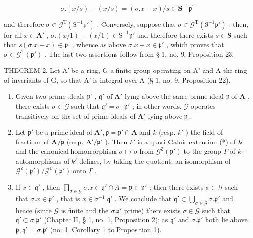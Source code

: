 \[
\sigma . (x / s) - (x / s) = (\sigma . x - x) / s \in \mathbf {S} ^ {- 1} \mathfrak {p} ^ {\prime}
\]

and therefore \(\sigma \in \mathcal{G}^{\mathrm{T}}(\mathrm{S}^{-1}\mathfrak{p}')\) . Conversely, suppose that \(\sigma \in \mathcal{G}^{\mathrm{T}}(\mathrm{S}^{-1}\mathfrak{p}')\) ; then, for all \(x \in \mathbf{A}'\) , \(\sigma.(x/1) - (x/1) \in \mathrm{S}^{-1}\mathfrak{p}'\) and therefore there exists \(s \in \mathbf{S}\) such that \(s(\sigma.x - x) \in \mathfrak{p}'\) , whence as above \(\sigma.x - x \in \mathfrak{p}'\) , which proves that \(\sigma \in \mathcal{G}^{\mathrm{T}}(\mathfrak{p}')\) . The last two assertions follow from § 1, no. 9, Proposition 23.

THEOREM 2. Let A' be a ring, G a finite group operating on A' and A the ring of invariants of G, so that A' is integral over A (§ 1, no. 9, Proposition 22).

\begin{enumerate}
\def\labelenumi{(\roman{enumi})}
\item
  Given two prime ideals \(\mathfrak{p}'\) , \(\mathfrak{q}'\) of \(\mathbf{A}'\) lying above the same prime ideal \(\mathfrak{p}\) of \(\mathbf{A}\) , there exists \(\sigma \in \mathcal{G}\) such that \(\mathfrak{q}' = \sigma \cdot \mathfrak{p}'\) ; in other words, \(\mathcal{G}\) operates transitively on the set of prime ideals of \(\mathbf{A}'\) lying above \(\mathfrak{p}\) .
\item
  Let \(\mathfrak{p}'\) be a prime ideal of \(\mathbf{A}', \mathfrak{p} = \mathfrak{p}' \cap \mathbf{A}\) and \(k\) (resp. \(k'\) ) the field of fractions of \(\mathbf{A}/\mathfrak{p}\) (resp. \(\mathbf{A}'/\mathfrak{p}'\) ). Then \(k'\) is a quasi-Galois extension (*) of \(k\) and the canonical homomorphism \(\sigma \mapsto \bar{\sigma}\) from \(\mathcal{G}^{\mathrm{Z}}(\mathfrak{p}')\) to the group \(\Gamma\) of \(k\) -automorphisms of \(k'\) defines, by taking the quotient, an isomorphism of \(\mathcal{G}^{\mathrm{Z}}(\mathfrak{p}') / \mathcal{G}^{\mathrm{T}}(\mathfrak{p}')\) onto \(\Gamma\) .
\setcounter{enumi}{0}
\item
  If \(x \in \mathfrak{q}'\) , then \(\prod_{\sigma \in \mathcal{G}} \sigma. x \in \mathfrak{q}' \cap A = \mathfrak{p} \subset \mathfrak{p}'\) ; then there exists \(\sigma \in \mathcal{G}\) such that \(\sigma. x \in \mathfrak{p}'\) , that is \(x \in \sigma^{-1}. \mathfrak{q}'\) . We conclude that \(\mathfrak{q}' \subset \bigcup_{\sigma \in \mathcal{G}} \sigma. \mathfrak{p}'\) and hence (since \(\mathcal{G}\) is finite and the \(\sigma. \mathfrak{p}'\) prime) there exists \(\sigma \in \mathcal{G}\) such that \(\mathfrak{q}' \subset \sigma. \mathfrak{p}'\) (Chapter II, § 1, no. 1, Proposition 2); as \(\mathfrak{q}'\) and \(\sigma. \mathfrak{p}'\) both lie above \(\mathfrak{p}, \mathfrak{q}' = \sigma. \mathfrak{p}'\) (no. 1, Corollary 1 to Proposition 1).
\end{enumerate}

